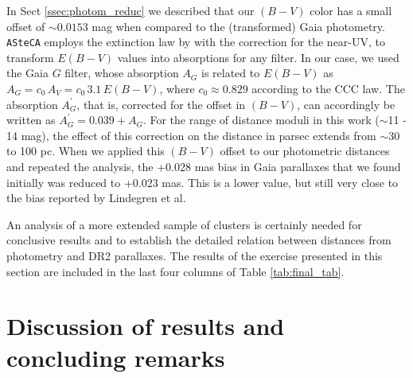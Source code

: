\documentclass[draft]{aa}
\begin{document}
In Sect \ref{ssec:photom_reduc} we described that our $(B-V)$ color has a small
offset of $\sim0.0153$ mag when compared to the (transformed) Gaia photometry.
\texttt{ASteCA} employs the extinction law by \citet[][CCC law]{Cardelli_1989}
with the \citet{Odonnell_1994} correction for the near-UV, to transform $E
(B-V)$ values into absorptions for any filter.
In our case, we used the Gaia $G$ filter, whose absorption $A_G$ is related to $E
(B-V)$ as $A_G = c_0 \, A_V  = c_0 \, 3.1 \, E(B-V)$, where $c_0\approx0.829$
according to the CCC law. The absorption $A_{G}^{\prime}$, that is,
corrected for the offset in $(B-V)$, can accordingly be written as $A_{G}^
{\prime}=0.039+A_G$.
For the range of distance moduli in this work ($\sim$11 - 14 mag), the effect
of this correction on the distance in parsec extends from $\sim$30 to 100 pc.
When we applied this $(B-V)$ offset to our photometric distances and repeated the
analysis, the +0.028 mas bias in Gaia parallaxes that we found
initially was reduced to +0.023 mas. This is a lower value, but still very
close to the bias reported by Lindegren et al.

An analysis of a more extended sample of clusters is certainly needed for conclusive results and to establish the detailed relation between
distances from photometry and DR2 parallaxes. The results of the exercise
presented in this section are included in the last four columns of Table 
\ref{tab:final_tab}.




\section{Discussion of results and concluding remarks}
\label{sec:results_concl}
\end{document}

